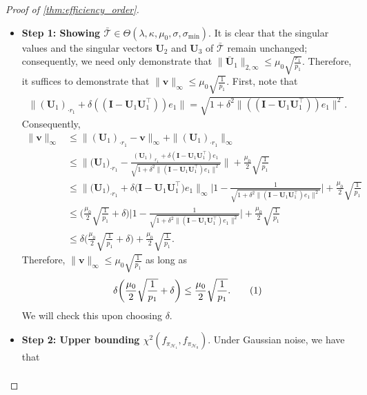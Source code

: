 \documentclass[10pt]{article}
\newcommand{\0}{{\mathbf{0}}}
\newcommand{\1}{{\mathbf{1}}}
\newcommand{\U}{{\mathbf{U}}}
\renewcommand{\t}{^{\top}}
\newcommand\numberthis{\addtocounter{equation}{1}\tag{\theequation}}
\begin{document}
\begin{proof}[Proof of \cref{thm:efficiency_order}]
\begin{itemize}
    \item \textbf{Step 1: Showing $\mathcal{\bar T} \in \Theta(\lambda,\kappa,\mu_0,\sigma,\sigma_{\min}).$} It is clear that the singular values and the singular vectors $\U_2$ and $\U_3$ of $\mathcal{\bar T}$ remain unchanged; consequently, we need only demonstrate that $ \|\mathbf{\bar U}_1\|_{2,\infty} \leq \mu_0 \sqrt{\frac{r_1}{p_1}}$. Therefore, it suffices to demonstrate that $\|\mathbf{v} \|_{\infty} \leq \mu_0 \sqrt{\frac{1}{p_1}}$. First, note that \begin{align*}
    \|  (\U_1)_{\cdot r_1} + \delta ((\mathbf{I} - \U_{1} \U_{1}\t )) e_1 \| = \sqrt{1 + \delta^2 \| ((\mathbf{I} - \U_{1} \U_{1}\t ) ) e_1 \|^2}.
\end{align*}
Consequently,
\begin{align*}
    \| \mathbf{v} \|_{\infty} &\leq \| (\U_1)_{\cdot r_1} - \mathbf{v} \|_{\infty} + \|(\U_1)_{\cdot r_1} \|_{\infty} \\
    &\leq \bigg\| \big(\mathbf{U}_1\big)_{\cdot r_1} - \frac{(\U_1)_{\cdot r_1} + \delta (\mathbf{I} - \U_1 \U_1\t ) e_1}{\sqrt{1 + \delta^2 \| (\mathbf{I} - \U_1 \U_1\t ) e_1 \|^2}} \bigg\| + \frac{\mu_0}{2} \sqrt{\frac{1}{p_1}} \\
    &\leq \bigg\| \big( \U_1 \big)_{\cdot r_1} + \delta \big( \mathbf{I} - \U_1  \U_1\t \big) e_1 \bigg\|_{\infty} \bigg| 1 - \frac{1}{\sqrt{1 + \delta^2 \| (\mathbf{I} - \U_1\U_1\t) e_1\|^2}} \bigg| + \frac{\mu_0}{2} \sqrt{\frac{1}{p_1}} \\
    &\leq \bigg( \frac{\mu_0}{2} \sqrt{\frac{1}{p_1}} + \delta \bigg) \bigg| 1 - \frac{1}{\sqrt{1 + \delta^2 \| (\mathbf{I} - \U_1\U_1\t) e_1\|^2}} \bigg|+ \frac{\mu_0}{2} \sqrt{\frac{1}{p_1}} \\
    &\leq \delta \bigg( \frac{\mu_0}{2} \sqrt{\frac{1}{p_1}} + \delta \bigg) +  \frac{\mu_0}{2} \sqrt{\frac{1}{p_1}}.
\end{align*}
Therefore, $\|\mathbf{v} \|_{\infty} \leq \mu_0 \sqrt{\frac{1}{p_1}}$ as long as 
\begin{align*}
    \delta \bigg( \frac{\mu_0}{2} \sqrt{\frac{1}{p_1}} + \delta \bigg) \leq \frac{\mu_0}{2}  \sqrt{\frac{1}{p_1}}. \numberthis \label{eq:choosedelta}
\end{align*}
We will check this upon choosing $\delta$.
    \item \textbf{Step 2: Upper bounding $\chi^2(f_{\pi_{\mathcal{H}_1}}, f_{\pi_{\mathcal{H}_0}})$}. Under Gaussian noise, we have that
\begin{align*}

\end{align*}
\end{itemize}
\end{proof}
\end{document}
